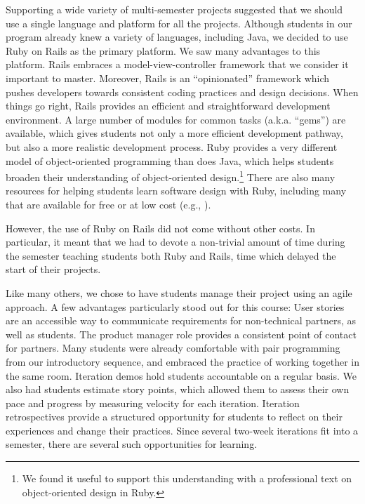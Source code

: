 Supporting a wide variety of multi-semester projects suggested that
we should use a single language and platform for all the
projects.
Although students in our program already knew
a variety of languages, including Java, we decided to use Ruby on
Rails as the primary platform.  We saw many advantages to this
platform. Rails embraces a model-view-controller framework that we
consider it important to master. Moreover, Rails is an ``opinionated'' framework
which pushes developers towards consistent coding practices and
design decisions.  When things go right, Rails provides an efficient
and straightforward development environment.  A large number of
modules for common tasks (a.k.a. ``gems'') are available, which
gives students not only a more efficient development pathway, but
also a more realistic development process. Ruby provides a very
different model of object-oriented programming than does Java, which
helps students broaden their understanding of object-oriented
design.\footnote{We found it useful to support this understanding
with a professional text on object-oriented design in Ruby.\cite{poodr}}
There are also many resources for helping students
learn software design with Ruby, including many that are available
for free or at low cost (e.g., \cite{saasbook,rails-tutorial}).

However, the use of Ruby on Rails did not come without other costs.  In
particular, it meant that we had to devote a non-trivial amount of
time during the semester teaching students both Ruby and Rails, time
which delayed the start of their projects.

Like many others, we chose to have students manage their project using an 
agile approach.  A few advantages particularly stood out
for this course: User stories are an accessible way to communicate
requirements for non-technical partners, as well as students. 
The product manager role provides a consistent point of contact for partners. 
Many students were already comfortable with pair programming from our 
introductory sequence, and embraced the 
practice of working together in the same room.
Iteration demos hold students accountable on a regular basis.  
We also had students estimate story points, which allowed them to assess 
their own pace and progress by measuring velocity for each iteration.
Iteration retrospectives provide a structured opportunity for students 
to reflect on their experiences and change their practices.  
Since several two-week iterations fit into a 
semester, there are several such opportunities for learning.

